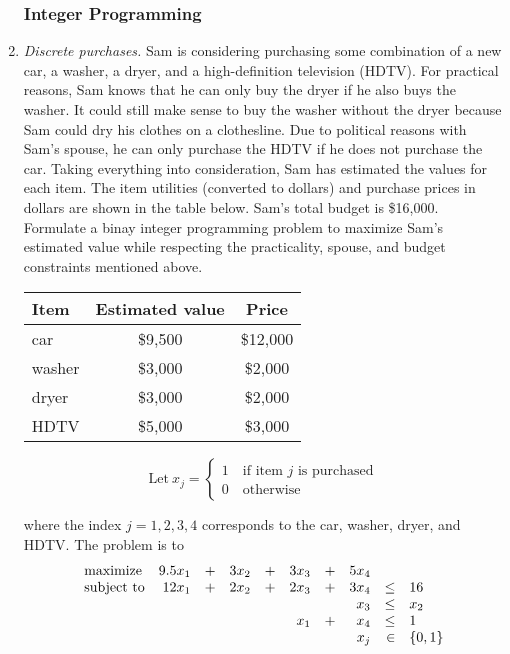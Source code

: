 \begin{enumerate}
\begin{solution}
\end{solution}

\subsubsection*{Integer Programming}
\item \emph{Discrete purchases.} Sam is considering purchasing some
  combination of a new car, a washer, a dryer, and a high-definition
  television (HDTV). For practical reasons, Sam knows that he can only
  buy the dryer if he also buys the washer. It could still make sense
  to buy the washer without the dryer because Sam could dry his
  clothes on a clothesline. Due to political reasons with Sam's
  spouse, he can only purchase the HDTV if he does not purchase the
  car. Taking everything into consideration, Sam has estimated the
  values for each item. The item utilities (converted to dollars) and
  purchase prices in dollars are shown in the table below.  Sam's
  total budget is \$16,000. Formulate a binay integer programming
  problem to maximize Sam's estimated value while respecting the
  practicality, spouse, and budget constraints mentioned above.

\begin{center}
\begin{tabular}{lcc}
Item    &  Estimated value  & Price   \\  \hline
car     &   \$9,500   &  \$12,000 \\
washer  &   \$3,000   &  \$2,000  \\
dryer   &   \$3,000   &  \$2,000  \\
HDTV    &   \$5,000   &  \$3,000  \\
\end{tabular}
\end{center}

\begin{solution}
\bs

\[ \text{Let}~x_j = \begin{cases}
1 \quad \text{if item $j$ is purchased}\\
0 \quad \text{otherwise} \end{cases}
\]

where the index $j = 1,2,3,4$ corresponds to the car, washer, dryer,
and HDTV. The problem is to 
\[
\begin{array}{lrrrrrrrrl}
\textrm{maximize}   & 9.5x_1& +& 3x_2&+& 3x_3 &+& 5x_4 & & \\
  \textrm{subject to} & 12x_1& +& 2x_2&+& 2x_3 &+& 3x_4 & \leq & 16 \\
                    &&&&&& &x_3 & \leq & x_2 \\
                    &&&&& x_1 & + & x_4 &\leq& 1 \\
\multicolumn{8}{r}{x_j}&  \in & \{0,1\}
\end{array}
\]
\end{solution}


\end{enumerate}
